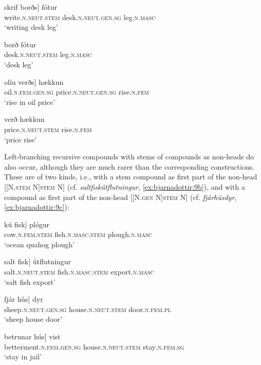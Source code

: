 \documentclass[output=paper]{LSP/langsci}
\begin{document}
\ea%
 \label{ex:bjarnadottir:8} 
\ea  \label{ex:bjarnadottir:8a}
\gll {\ob}skrif borðs] fótur\\
   write\textsc{.n.neut.stem} desk\textsc{.n.neut.gen.sg} leg\textsc{.n.masc}\\
\glt ‘writing desk leg’

\ex  \label{ex:bjarnadottir:8b}
\gll borð fótur \\
 desk\textsc{.n.neut.stem} leg\textsc{.n.masc}\\
\glt ‘desk leg’

\ex  \label{ex:bjarnadottir:8c}
\gll {\ob}olíu verðs] hækkun\\
 oil\textsc{.n.fem.gen.sg} price\textsc{.n.neut.gen.sg} rise\textsc{.n.fem}\\
\glt ‘rise in oil price’

\ex  \label{ex:bjarnadottir:8d}
\gll verð hækkun \\
 price\textsc{.n.neut.stem} rise\textsc{.n.fem}\\
\glt ‘price rise’
\z
\z

Left-branching recursive compounds with stems of compounds as non-heads do also occur, although they are much rarer than the corresponding  constructions. These are of two kinds, i.e., with a stem compound as first part of the non-head [[N.\textsc{stem} N]\textsc{stem} N] (cf. \textit{saltfiskútflutningur}, \ref{ex:bjarnadottir:9b}),  and with a  compound as first part of the non-head [[N\textsc{.gen} N]\textsc{stem} N] (cf. \textit{fjárhúsdyr}, \ref{ex:bjarnadottir:9c}):

\ea%
 \label{ex:bjarnadottir:9}
\ea  \label{ex:bjarnadottir:9a}
\gll {\ob}kú fisk] plógur\\
 	  cow\textsc{.n.fem.stem} fish\textsc{.n.masc.stem} plough\textsc{.n.masc}\\
\glt ‘ocean quahog plough’

\ex \label{ex:bjarnadottir:9b}
\gll {\ob}salt fisk] útflutningur\\
     salt\textsc{.n.neut.stem} fish\textsc{.n.masc.stem} export\textsc{.n.masc}\\
\glt ‘salt fish export’

\ex \label{ex:bjarnadottir:9c}
\gll {\ob}fjár hús] dyr\\
      sheep\textsc{.n.neut.gen.sg} house\textsc{.n.neut.stem} door\textsc{.n.fem.pl}\\
\glt ‘sheep house door’

\ex \label{ex:bjarnadottir:9d}
\gll {\ob}betrunar hús] vist\\
    betterment\textsc{.n.fem.gen.sg} house\textsc{.n.neut.stem} stay\textsc{.n.fem.sg}\\
\glt ‘stay in jail’ 
\end{document}
